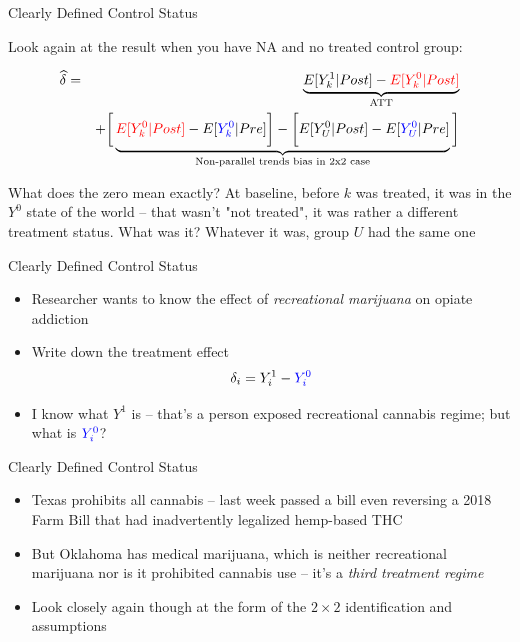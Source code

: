 \documentclass{beamer}
\begin{document}
\begin{frame}{Clearly Defined Control Status}

Look again at the result when you have NA and no treated control group:

\begin{eqnarray*}
\widehat{\delta} &=& \underbrace{E[Y^1_k | Post] - \textcolor{red}{E[Y^0_k | Post]}}_{\mathclap{\text{ATT}}} \\
&& + \bigg [  \underbrace{\textcolor{red}{E[Y^0_k | Post]} - E[\textcolor{blue}{Y^0_k} | Pre] \bigg ] - \bigg [ E[Y^0_U | Post] - E[\textcolor{blue}{Y_U^0} | Pre] }_{\mathclap{\text{Non-parallel trends bias in 2x2 case}}} \bigg ]
\end{eqnarray*}

What does the zero mean exactly?  At baseline, before $k$ was treated, it was in the $Y^0$ state of the world -- that wasn't "not treated", it was rather a different treatment status.  What was it?  Whatever it was, group $U$ had the same one

\end{frame}

\begin{frame}{Clearly Defined Control Status}

\begin{itemize}
\item Researcher wants to know the effect of \emph{recreational marijuana} on opiate addiction
\item Write down the treatment effect $$\delta_i = Y^1_i - \textcolor{blue}{Y^0_i}$$
\item I know what $Y^1$ is -- that's a person exposed recreational cannabis regime; but what is $\textcolor{blue}{Y^0_i}$?

\end{itemize}

\end{frame}

\begin{frame}{Clearly Defined Control Status}

\begin{itemize}
\item Texas prohibits all cannabis -- last week passed a bill even reversing a 2018 Farm Bill that had inadvertently legalized hemp-based THC
\item But Oklahoma has medical marijuana, which is neither recreational marijuana nor is it prohibited cannabis use -- it's a \emph{third treatment regime}
\item Look closely again though at the form of the $2 \times 2$ identification and assumptions
\end{itemize}


\end{frame}
\end{document}
